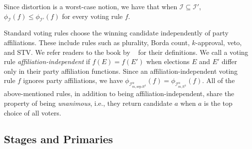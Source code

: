 \documentclass[letterpaper]{article} %
\newcommand{\citet}[1]{\citeauthor{#1}~\shortcite{#1}}
\theoremstyle{definition}
\newcommand{\bbR}{\mathbb{R}}
\newcommand{\calI}{\mathcal{I}}
\newcommand{\sep}{\textrm{sep-}}
\newcommand{\euc}[1]{\bbR^{#1}}
\newcommand{\eucsep}[1]{\sep\euc{#1}}
\newcommand{\I}{\calI}
\begin{document}
Since distortion is a worst-case notion, we have that when $\calI \subseteq \calI'$, $\phi_{\calI}(f) \le \phi_{\calI'}(f)$ for every voting rule $f$.

Standard voting rules choose the winning candidate independently of party affiliations. These include rules such as plurality, Borda count, $k$-approval, veto, and STV. We refer readers to the book by \citet{BCELP16} for their definitions. We call a voting rule \emph{affiliation-independent} if $f(E) = f(E')$ when elections $E$ and $E'$ differ only in their party affiliation functions. Since an affiliation-independent voting rule $f$ ignores party affiliations, we have $\phi_{\I^{\alpha}_{m,\eucsep{k}}}(f) = \phi_{\I^{\alpha}_{m,\euc{k}}}(f)$. All of the above-mentioned rules, in addition to being affiliation-independent, share the property of being \emph{unanimous}, i.e., they return candidate $a$ when $a$ is the top choice of all voters.

\subsection{Stages and Primaries}
\end{document}
